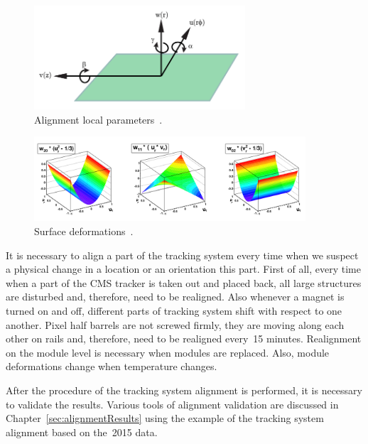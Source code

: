 \begin{figure}[htb]
    \begin{center}
        \includegraphics[width=0.70\textwidth]{../figs/Alignment/alignment_strip_coords.png}
    \end{center}
    \caption{Alignment local parameters~\cite{ref_Frank_thesis}.}
    \label{fig:alignmentParameters}
\end{figure}

\begin{figure}[htb]
    \begin{center}
        \includegraphics[width=0.90\textwidth]{../figs/Alignment/alignment_surface_deformations.png}
    \end{center}
    \caption{Surface deformations~\cite{ref_Alignment}.}
    \label{fig:surfaceDeformations}
\end{figure}

It is necessary to align a part of the tracking system every time when we suspect a physical change in a location or an orientation this part. First of all, every time when a part of the CMS tracker is taken out and placed back, all large structures are disturbed and, therefore, need to be realigned. Also whenever a magnet is turned on and off, different parts of tracking system shift with respect to one another. Pixel half barrels are not screwed firmly, they are moving along each other on rails and, therefore, need to be realigned every~15 minutes. Realignment on the module level is necessary when modules are replaced. Also, module deformations change when temperature changes. 

After the procedure of the tracking system alignment is performed, it is necessary to validate the results. Various tools of alignment validation are discussed in Chapter~\ref{sec:alignmentResults} using the example of the tracking system alignment based on the~2015 data.   

